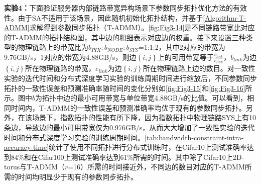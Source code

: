 \begin{table}[!htpb]
    \center
    \caption{节点带宽异构场景下测试准确率达到设定值所需的时间（单位：s）}
    \label{tab:bandwidth-constraint-accuracy-time}
\end{table}

\textbf{实验4：}下面验证服务器内部链路带宽异构场景下参数同步拓扑优化方法的有效性。由于SA不适用于该场景，因此随机初始化拓扑结构，并基于\autoref{Algorithm-T-ADMM}求解得到参数同步拓扑（T-ADMM）。\autoref{fig:Fig3-14}是不同链路带宽比对应的T-ADMM的拓扑结构图，其中边的粗细表示对应边的权重。接下来设置三种类型的物理链路上的带宽比为$b_{PIX}:b_{NODE}:b_{SYS}$=1:1:2，其中2对应的带宽为9.76GB/s，1对应的带宽为4.88GB/s，则边$\left\{ i,j \right\} $上的可用带宽等于$\frac{b_{link}}{e_{link}}$，$b_{link}$为边$\left\{ i,j \right\} $所在物理链路的带宽，$e_{link}$为边$\left\{ i,j \right\} $所在物理链路上边的数目。对一致性实验的迭代时间和分布式深度学习实验的训练周期时间进行缩放后，不同参数同步拓扑的一致性误差和预测准确率随时间的变化分别如\autoref{fig:Fig3-15}和\autoref{fig:Fig3-16}所示。图中$b$为拓扑中边的最小可用带宽与单位带宽4.88GB/s的比值。可以看到，相同时间内，T-ADMM的一致性误差和预测准确率均优于现有的参数同步拓扑。另外，在该场景下，指数拓扑的性能有所下降，因为指数拓扑中物理链路SYS上有10条边，导致边的最小可用带宽仅为0.976GB/s，从而大大增加了一致性实验的迭代时间和分布式深度学习实验的训练周期时间。\autoref{tab:bandwidth-constraint-intra-accuracy-time}统计了使用不同拓扑进行分布式训练时，在Cifar10上测试准确率达到84\%和在Cifar100上测试准确率达到61\%所需的时间。其中除了Cifar10上2D-torus与T-ADMM（$r$=16）所需的时间接近外，不同边的数目对应的T-ADMM所需的时间均明显少于现有的参数同步拓扑。

